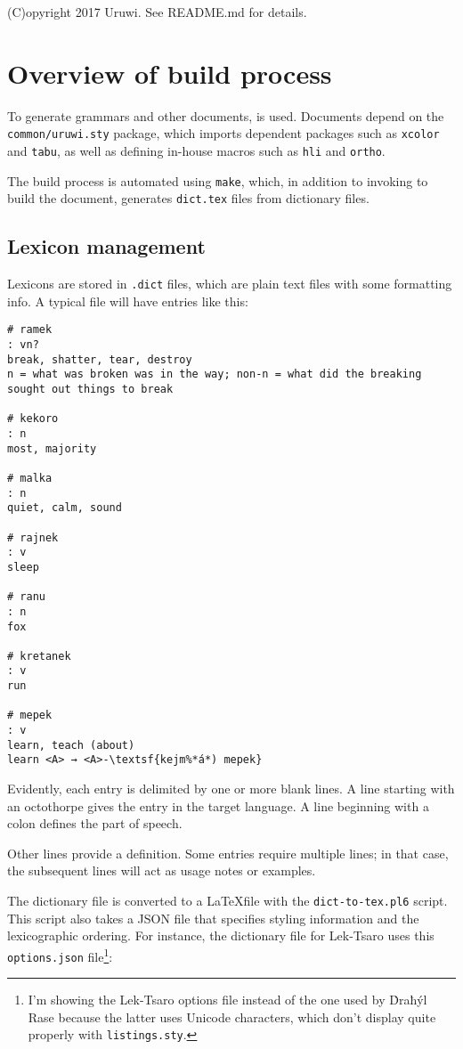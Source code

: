\documentclass{book}
\begin{document}
(C)opyright 2017 Uruwi. See README.md for details.

\tableofcontents

\chapter{Overview of build process}

To generate grammars and other documents, \XeLaTeX{} is used. Documents depend on the \texttt{common/uruwi.sty} package, which imports dependent packages such as \texttt{xcolor} and \texttt{tabu}, as well as defining in-house macros such as \texttt{\bs{}hli} and \texttt{\bs{}ortho}.

The build process is automated using \texttt{make}, which, in addition to invoking \XeLaTeX{} to build the document, generates \texttt{dict.tex} files from dictionary files.

\section{Lexicon management}

Lexicons are stored in \texttt{.dict} files, which are plain text files with some formatting info. A typical file will have entries like this:

\begin{lstlisting}
# ramek
: vn?
break, shatter, tear, destroy
n = what was broken was in the way; non-n = what did the breaking sought out things to break

# kekoro
: n
most, majority

# malka
: n
quiet, calm, sound

# rajnek
: v
sleep

# ranu
: n
fox

# kretanek
: v
run

# mepek
: v
learn, teach (about)
learn <A> → <A>-\textsf{kejm%*á*) mepek}
\end{lstlisting}

Evidently, each entry is delimited by one or more blank lines. A line starting with an octothorpe gives the entry in the target language. A line beginning with a colon defines the part of speech.

Other lines provide a definition. Some entries require multiple lines; in that case, the subsequent lines will act as usage notes or examples.

The dictionary file is converted to a \LaTeX file with the \texttt{dict-to-tex.pl6} script. This script also takes a JSON file that specifies styling information and the lexicographic ordering. For instance, the dictionary file for Lek-Tsaro uses this \texttt{options.json} file\footnote{I'm showing the Lek-Tsaro options file instead of the one used by Ḋraħýl Rase because the latter uses Unicode characters, which don't display quite properly with \texttt{listings.sty}.}:
\end{document}
